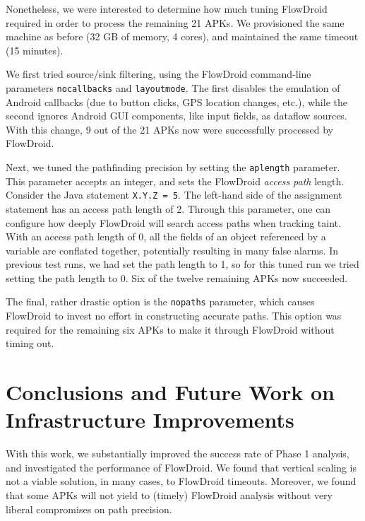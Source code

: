 Nonetheless, we were interested to determine how much tuning FlowDroid required in order to process the remaining 21 APKs.  We provisioned the same machine as before (32 GB of memory, 4 cores), and maintained the same timeout (15 minutes).  

We first tried source/sink filtering, using the FlowDroid command-line parameters \texttt{nocallbacks} and \texttt{layoutmode}.  The first disables the emulation of Android callbacks (due to button clicks, GPS location changes, etc.), while the second ignores Android GUI components, like input fields, as dataflow sources.  With this change, 9 out of the 21 APKs now were successfully processed by FlowDroid. 

Next, we tuned the pathfinding precision by setting the \texttt{aplength} parameter.  This parameter accepts an integer, and sets the FlowDroid \emph{access path} length.  Consider the Java statement \texttt{X.Y.Z = 5}.  The left-hand side of the assignment statement has an access path length of 2.  Through this parameter, one can configure how deeply FlowDroid will search access paths when tracking taint.  With an access path length of 0, all the fields of an object referenced by a variable are conflated together, potentially resulting in many false alarms.  In previous test runs, we had set the path length to 1, so for this tuned run we tried setting the path length to 0.  Six of the twelve remaining APKs now succeeded. 

The final, rather drastic option is the \texttt{nopaths} parameter, which causes FlowDroid to invest no effort in constructing accurate paths.  
This option was required for the remaining six APKs to make it through FlowDroid without timing out.

\section{Conclusions and Future Work on Infrastructure Improvements}
With this work, we substantially improved the success rate of Phase 1 analysis, and investigated the performance of FlowDroid.  We found that vertical scaling is not a viable solution, in many cases, to FlowDroid timeouts.  Moreover, we found that some APKs will not yield to (timely) FlowDroid analysis without very liberal compromises on path precision.

